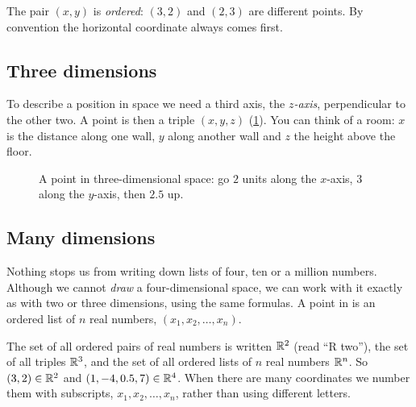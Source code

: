 \begin{pitfall}
The pair $(x, y)$ is \emph{ordered}: $(3, 2)$ and $(2, 3)$ are different points.
By convention the horizontal coordinate always comes first.
\end{pitfall}

\subsection{Three dimensions}

To describe a position in space we need a third axis, the \emph{$z$-axis},
perpendicular to the other two. A point is then a triple $(x, y, z)$
(\cref{fig:3d-axes}). You can think of a room: $x$ is the distance along one
wall, $y$ along another wall and $z$ the height above the floor.

\begin{figure}[htbp]
\centering
{}
\caption{A point in three-dimensional space: go $2$ units along the $x$-axis,
  $3$ along the $y$-axis, then $2.5$ up.}
\label{fig:3d-axes}
\end{figure}

\subsection{Many dimensions}

Nothing stops us from writing down lists of four, ten or a million numbers.
Although we cannot \emph{draw} a four-dimensional space, we can work with it
exactly as with two or three dimensions, using the same formulas. A point in
 is an ordered list of $n$
real numbers, $(x_1, x_2, \dots, x_n)$.

\begin{notation}
The set of all ordered pairs of real numbers is written $\mathbb{R}^2$ (read
``R two''), the set of all triples $\mathbb{R}^3$, and the set of all ordered lists of
$n$ real numbers $\mathbb{R}^n$. So $(3, 2) \in \mathbb{R}^2$ and
$(1, -4, 0.5, 7) \in \mathbb{R}^4$. When there are many coordinates we number them
with subscripts, $x_1, x_2, \dots, x_n$, rather than using different letters.
\end{notation}

